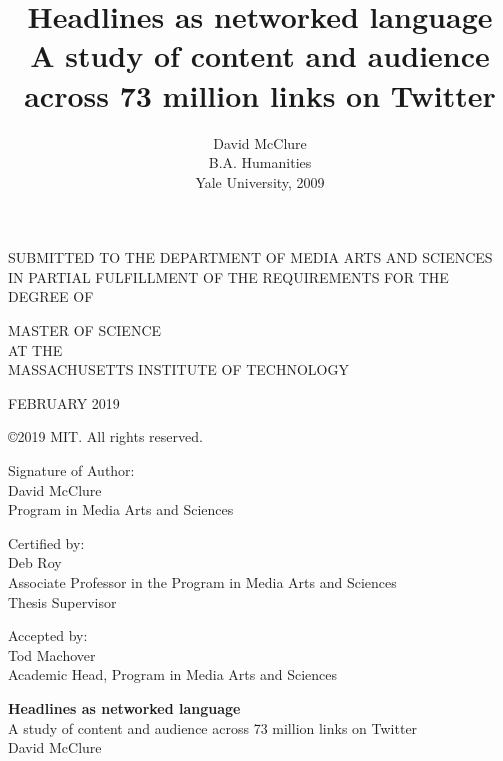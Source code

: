 \documentclass{scrartcl}
\begin{document}
\title{%
  \vspace{-2cm}Headlines as networked language\vspace{1ex} \\
  \large A study of content and audience across 73 million links on Twitter
}

\author{
  David McClure\vspace{3ex}\\
  B.A. Humanities\\
  Yale University, 2009
}

\date{\vspace{-5ex}}

\maketitle

\begin{center}
SUBMITTED TO THE DEPARTMENT OF MEDIA ARTS AND SCIENCES IN PARTIAL FULFILLMENT OF THE REQUIREMENTS FOR THE DEGREE OF

MASTER OF SCIENCE\\
AT THE\\
MASSACHUSETTS INSTITUTE OF TECHNOLOGY

FEBRUARY 2019

©2019 MIT. All rights reserved.
\end{center}

Signature of Author: \makebox[\linegoal]{\hrulefill}\\
David McClure\\
Program in Media Arts and Sciences\vspace{3ex}

Certified by: \makebox[\linegoal]{\hrulefill}\\
Deb Roy\\
Associate Professor in the Program in Media Arts and Sciences\\
Thesis Supervisor\vspace{3ex}

Accepted by: \makebox[\linegoal]{\hrulefill}\\
Tod Machover\\
Academic Head, Program in Media Arts and Sciences

\newpage

\begin{center}
\textbf{Headlines as networked language}\vspace{1ex}\\
\small{A study of content and audience across 73 million links on Twitter}\vspace{2ex}\\
David McClure
\end{center}
\end{document}
